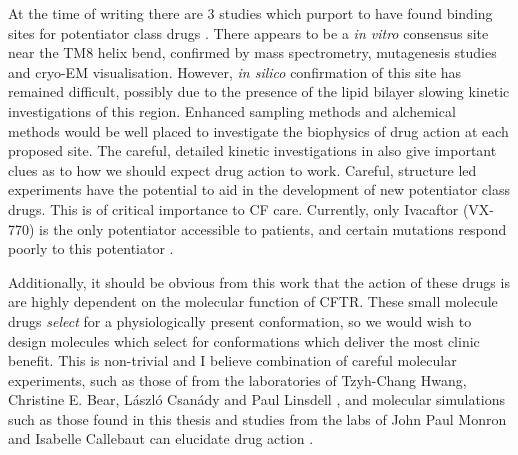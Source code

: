 At the time of writing there are 3 studies which purport to have found binding sites for potentiator class drugs \cite{}. There appears to be a \textit {in vitro} consensus site near the TM8 helix bend, confirmed by mass spectrometry, mutagenesis studies and cryo-EM visualisation. However, \textit{in silico} confirmation of this site has remained difficult, possibly due to the presence of the lipid bilayer slowing kinetic investigations of this region. Enhanced sampling methods and alchemical methods would be well placed to investigate the biophysics of drug action at each proposed site. The careful, detailed kinetic investigations in \cite{csanady2019} also give important clues as to how we should expect drug action to work. Careful, structure led experiments have the potential to aid in the development of new potentiator class drugs. This is of critical importance to CF care. Currently, only Ivacaftor (VX-770)  is the only potentiator accessible to patients, and certain mutations respond poorly to this potentiator \cite{phuan2018, vangoor2014}. 

Additionally, it should be obvious from this work that the action of these drugs is are highly dependent on the molecular function of CFTR. These small molecule drugs \textit{select} for a physiologically present conformation, so we would wish to design molecules which select for conformations which deliver the most clinic benefit. This is non-trivial and I believe  combination of careful molecular experiments, such as those of from the laboratories of Tzyh-Chang Hwang,  Christine E. Bear, L\'aszl\'o Csan\'ady and Paul Linsdell \cite{linsdell2018, csanady2019, zhang2017b}, and molecular simulations such as those found in this thesis and studies from the labs of John Paul Monron and Isabelle Callebaut can elucidate drug action \cite{hoffmann2018}.

